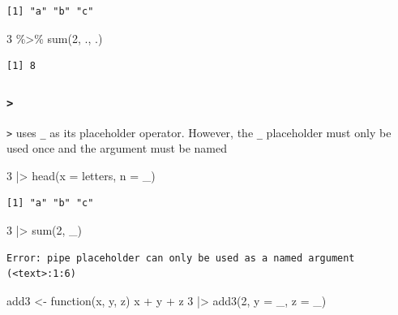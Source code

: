 \documentclass[
  letterpaper,
  DIV=11,
  numbers=noendperiod]{scrreprt}
\newenvironment{Shaded}{\begin{snugshade}}{\end{snugshade}}
\newcommand{\AttributeTok}[1]{\textcolor[rgb]{0.40,0.45,0.13}{#1}}
\newcommand{\ControlFlowTok}[1]{\textcolor[rgb]{0.00,0.23,0.31}{#1}}
\newcommand{\DecValTok}[1]{\textcolor[rgb]{0.68,0.00,0.00}{#1}}
\newcommand{\FunctionTok}[1]{\textcolor[rgb]{0.28,0.35,0.67}{#1}}
\newcommand{\NormalTok}[1]{\textcolor[rgb]{0.00,0.23,0.31}{#1}}
\newcommand{\OtherTok}[1]{\textcolor[rgb]{0.00,0.23,0.31}{#1}}
\newcommand{\SpecialCharTok}[1]{\textcolor[rgb]{0.37,0.37,0.37}{#1}}
\begin{document}
\begin{tcolorbox}
\begin{tcolorbox}
\begin{verbatim}
[1] "a" "b" "c"
\end{verbatim}

\begin{Shaded}
\begin{Highlighting}[]
\DecValTok{3} \SpecialCharTok{\%\textgreater{}\%} \FunctionTok{sum}\NormalTok{(}\DecValTok{2}\NormalTok{, ., .)}
\end{Highlighting}
\end{Shaded}

\begin{verbatim}
[1] 8
\end{verbatim}

\hypertarget{section-1}{%
\subsubsection{\texorpdfstring{\texttt{\textbar{}\textgreater{}}}{\textbar\textgreater{}}}\label{section-1}}

\texttt{\textbar{}\textgreater{}} uses \texttt{\_} as its placeholder
operator. However, the \texttt{\_} placeholder must only be used once
and the argument must be named

\begin{Shaded}
\begin{Highlighting}[]
\DecValTok{3} \SpecialCharTok{|\textgreater{}} \FunctionTok{head}\NormalTok{(}\AttributeTok{x =}\NormalTok{ letters, }\AttributeTok{n =}\NormalTok{ \_)}
\end{Highlighting}
\end{Shaded}

\begin{verbatim}
[1] "a" "b" "c"
\end{verbatim}

\begin{Shaded}
\begin{Highlighting}[]
\DecValTok{3} \SpecialCharTok{|\textgreater{}} \FunctionTok{sum}\NormalTok{(}\DecValTok{2}\NormalTok{, \_)}
\end{Highlighting}
\end{Shaded}

\begin{verbatim}
Error: pipe placeholder can only be used as a named argument (<text>:1:6)
\end{verbatim}

\begin{Shaded}
\begin{Highlighting}[]
\NormalTok{add3 }\OtherTok{\textless{}{-}} \ControlFlowTok{function}\NormalTok{(x, y, z) x }\SpecialCharTok{+}\NormalTok{ y }\SpecialCharTok{+}\NormalTok{ z}
\DecValTok{3} \SpecialCharTok{|\textgreater{}} \FunctionTok{add3}\NormalTok{(}\DecValTok{2}\NormalTok{, }\AttributeTok{y =}\NormalTok{ \_, }\AttributeTok{z =}\NormalTok{ \_)}
\end{Highlighting}
\end{Shaded}


\end{tcolorbox}
\end{tcolorbox}
\end{document}
